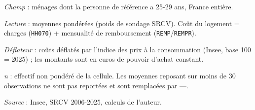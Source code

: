 \documentclass[12pt,a4paper]{article}
\begin{document}
\begin{table}[htbp]
\begin{threeparttable}
\begin{tablenotes}[flushleft]
				\item \textit{Champ} : ménages dont la personne de référence a 25-29 ans, France entière.
				\item \textit{Lecture} : moyennes pondérées (poids de sondage SRCV). Coût du logement =
				charges (\texttt{HH070}) + mensualité de remboursement (\texttt{REMP}/\texttt{REMPR}).
				\item \textit{Déflateur} : coûts déflatés par l'indice des prix à la consommation (Insee, base 100 = 2025) ; les montants sont en euros de pouvoir d'achat constant.
				\item \textit{n} : effectif non pondéré de la cellule. Les moyennes reposant sur
				moins de 30 observations ne sont pas reportées et sont remplacées par ---.
				\item \textit{Source} : Insee, SRCV 2006-2025, calculs de l'auteur.
			\end{tablenotes}
		\end{threeparttable}
	\end{table}
	
\end{document}
